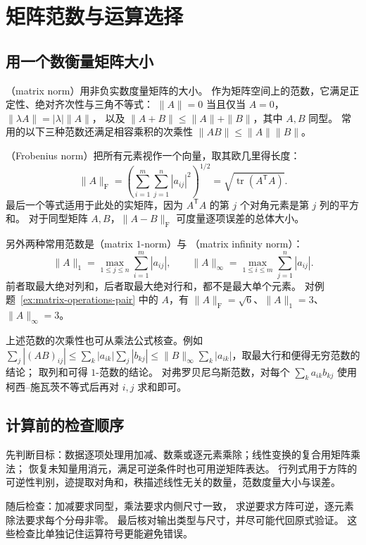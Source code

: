\documentclass[UTF8,12pt,a4paper,fontset=fandol]{ctexart}
\begin{document}
\section{矩阵范数与运算选择}

\subsection{用一个数衡量矩阵大小}

（matrix norm）用非负实数度量矩阵的大小。
作为矩阵空间上的范数，它满足正定性、绝对齐次性与三角不等式：
$\|A\|=0$ 当且仅当 $A=0$，$\|\lambda A\|=|\lambda|\|A\|$，
以及 $\|A+B\|\le\|A\|+\|B\|$，其中 $A,B$ 同型。
常用的以下三种范数还满足相容乘积的次乘性 $\|AB\|\le\|A\|\|B\|$。

（Frobenius norm）把所有元素视作一个向量，取其欧几里得长度：
\[
  \|A\|_{\mathrm F}
  =\left(\sum_{i=1}^{m}\sum_{j=1}^{n}|a_{ij}|^2\right)^{1/2}
  =\sqrt{\operatorname{tr}(A^{\mathsf T}A)}.
\]
最后一个等式适用于此处的实矩阵，因为 $A^{\mathsf T}A$ 的第 $j$ 个对角元素是第 $j$ 列的平方和。
对于同型矩阵 $A,B$，$\|A-B\|_{\mathrm F}$ 可度量逐项误差的总体大小。

另外两种常用范数是（matrix $1$-norm）与
（matrix infinity norm）：
\[
  \|A\|_1=\max_{1\le j\le n}\sum_{i=1}^{m}|a_{ij}|,\qquad
  \|A\|_\infty=\max_{1\le i\le m}\sum_{j=1}^{n}|a_{ij}|.
\]
前者取最大绝对列和，后者取最大绝对行和，都不是最大单个元素。
对例题~\ref{ex:matrix-operations-pair} 中的 $A$，有
$\|A\|_{\mathrm F}=\sqrt6$、$\|A\|_1=3$、$\|A\|_\infty=3$。

上述范数的次乘性也可从乘法公式核查。例如
$\sum_j|(AB)_{ij}|\le\sum_k|a_{ik}|\sum_j|b_{kj}|
\le\|B\|_\infty\sum_k|a_{ik}|$，取最大行和便得无穷范数的结论；
取列和可得 $1$-范数的结论。
对弗罗贝尼乌斯范数，对每个 $\sum_k a_{ik}b_{kj}$ 使用柯西--施瓦茨不等式后再对 $i,j$ 求和即可。

\subsection{计算前的检查顺序}

先判断目标：数据逐项处理用加减、数乘或逐元素乘除；线性变换的复合用矩阵乘法；
恢复未知量用消元，满足可逆条件时也可用逆矩阵表达。
行列式用于方阵的可逆性判别，迹提取对角和，秩描述线性无关的数量，范数度量大小与误差。

随后检查：加减要求同型，乘法要求内侧尺寸一致，
求逆要求方阵可逆，逐元素除法要求每个分母非零。
最后核对输出类型与尺寸，并尽可能代回原式验证。
这些检查比单独记住运算符号更能避免错误。
\end{document}
